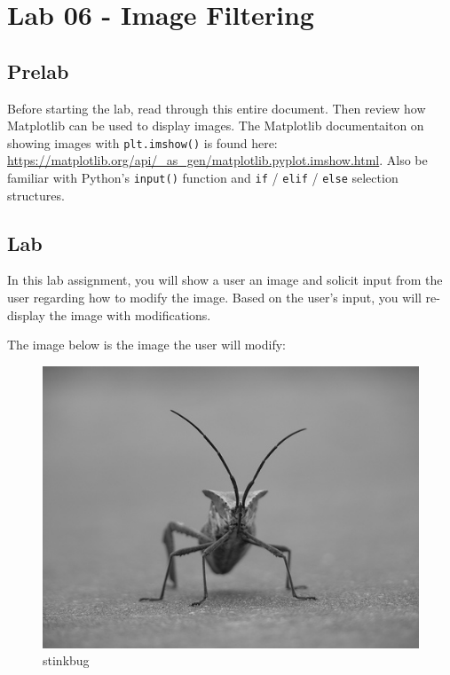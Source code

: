 \documentclass[11pt]{article}
\begin{document}
  
    \hypertarget{lab-06---image-filtering}{%
\section{Lab 06 - Image Filtering}\label{lab-06---image-filtering}}

    \hypertarget{prelab}{%
\subsection{Prelab}\label{prelab}}

Before starting the lab, read through this entire document. Then review
how Matplotlib can be used to display images. The Matplotlib
documentaiton on showing images with \texttt{plt.imshow()} is found
here:
\url{https://matplotlib.org/api/_as_gen/matplotlib.pyplot.imshow.html}.
Also be familiar with Python's \texttt{input()} function and \texttt{if}
/ \texttt{elif} / \texttt{else} selection structures.

    \hypertarget{lab}{%
\subsection{Lab}\label{lab}}

In this lab assignment, you will show a user an image and solicit input
from the user regarding how to modify the image. Based on the user's
input, you will re-display the image with modifications.

The image below is the image the user will modify:

\begin{figure}[h!]
\centering
\includegraphics[scale=0.3]{stinkbug.png}
\caption{stinkbug}
\end{figure}
\end{document}
